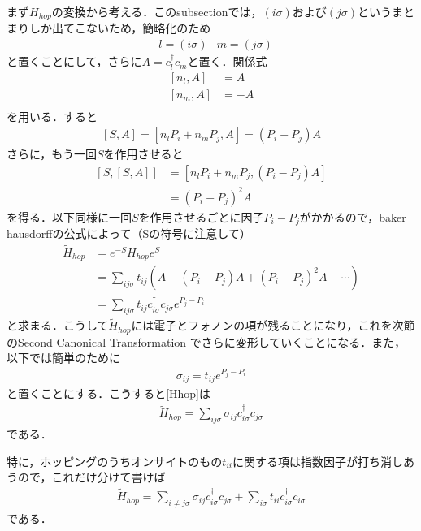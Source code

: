 \documentclass[a4j]{jarticle}
\begin{document}
まず$H_{hop}$の変換から考える．このsubsectionでは，$(i\sigma)$および$(j\sigma)$というまとまりしか出てこないため，簡略化のため
\begin{align}
 &l=(i\sigma) & m=(j\sigma)
\end{align}
と置くことにして，さらに$A=c^{\dagger}_lc_m$と置く．関係式
\begin{align}
 \left[n_l,A\right]&=A \\
 \left[n_m,A\right]&=-A \\
\end{align}
を用いる．すると
\begin{align}
 \left[S,A\right]=\left[n_lP_i+n_mP_j,A\right]=\left(P_i-P_j\right)A
\end{align}
さらに，もう一回$S$を作用させると
\begin{align}
 \left[S,\left[S,A\right]\right]&=\left[n_lP_i+n_mP_j,(P_i-P_j)A\right] \\
&=\left(P_i-P_j\right)^2A
\end{align}
を得る．以下同様に一回$S$を作用させるごとに因子$P_i-P_j$がかかるので，baker hausdorffの公式によって（Sの符号に注意して）
\begin{align}
 \tilde{H}_{hop}&=e^{-S}H_{hop}e^{S}\\
 &=\sum_{ij\sigma}t_{ij}\left(A-(P_i-P_j)A+(P_i-P_j)^2A-\cdots\right) \\
 &=\sum_{ij\sigma}t_{ij}c^{\dagger}_{i\sigma}c_{j\sigma}e^{P_j-P_i} \label{Hhop}
\end{align}
と求まる．こうして$\tilde{H}_{hop}$には電子とフォノンの項が残ることになり，これを次節のSecond Canonical Transformation でさらに変形していくことになる．また，以下では簡単のために
\begin{align}
 \sigma_{ij}=t_{ij}e^{P_j-P_i}
\end{align}
と置くことにする．こうすると\eqref{Hhop}は
\begin{align}
 \tilde{H}_{hop}=\sum_{ij\sigma}\sigma_{ij}c^{\dagger}_{i\sigma}c_{j\sigma}
\end{align}
である．

特に，ホッピングのうちオンサイトのもの$t_{ii}$に関する項は指数因子が打ち消しあうので，これだけ分けて書けば
\begin{align}
  \tilde{H}_{hop}=\sum_{i\neq j\sigma}\sigma_{ij}c^{\dagger}_{i\sigma}c_{j\sigma}+\sum_{i\sigma}t_{ii}c^{\dagger}_{i\sigma}c_{i\sigma}\label{hoponsite}
\end{align}
である．

\end{document}
